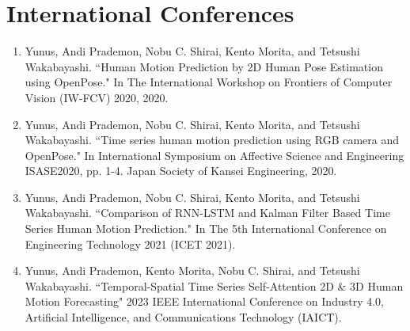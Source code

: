 \section*{International Conferences}
\begin{enumerate}
    \item Yunus, Andi Prademon, Nobu C. Shirai, Kento Morita, and Tetsushi Wakabayashi. ``Human Motion Prediction by 2D Human Pose Estimation using OpenPose." In The International Workshop on Frontiers of Computer Vision (IW-FCV) 2020, 2020. 
    \item Yunus, Andi Prademon, Nobu C. Shirai, Kento Morita, and Tetsushi Wakabayashi. ``Time series human motion prediction using RGB camera and OpenPose." In International Symposium on Affective Science and Engineering ISASE2020, pp. 1-4. Japan Society of Kansei Engineering, 2020.
    \item Yunus, Andi Prademon, Nobu C. Shirai, Kento Morita, and Tetsushi Wakabayashi. ``Comparison of RNN-LSTM and Kalman Filter Based Time Series Human Motion Prediction." In The 5th International Conference on Engineering Technology 2021 (ICET 2021).
    \item Yunus, Andi Prademon, Kento Morita, Nobu C. Shirai, and Tetsushi Wakabayashi. ``Temporal-Spatial Time Series Self-Attention 2D \& 3D Human Motion Forecasting" 2023 IEEE International Conference on Industry 4.0, Artificial Intelligence, and Communications Technology (IAICT).
    
\end{enumerate}

